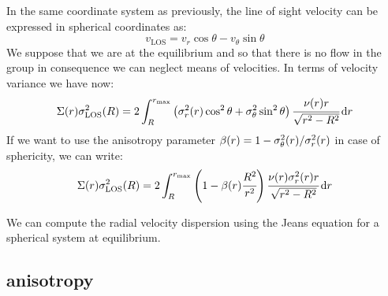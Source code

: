 In the same coordinate system as previously, the line of sight velocity can be
expressed in spherical coordinates as:
%
\begin{equation}
    v_{\mathrm{LOS}} = v_r \cos\theta - v_\theta \sin\theta
\end{equation}
%
We suppose that we are at the equilibrium and so that there is no flow in the
group in consequence we can neglect means of velocities. In terms of velocity
variance we have now:
%
\begin{equation}
    \Sigma(r)\sigma_{\mathrm{LOS}}^2(R) = 2\int_R^{r_{\max}}
    \left({\sigma_r^2(r)\cos^2\theta+\sigma_\theta^2\sin^2\theta}\right)
    \cfrac{\nu{(r)}{r}}{\sqrt{r^2-R^2}}\,{\rm{d}}{r}
\end{equation}
%
If we want to use the anisotropy parameter
$\beta(r)=1-\sigma_\theta^2(r)/\sigma_r^2(r)$ in case of sphericity, we can
write:
%
\begin{equation}
    \Sigma(r)\sigma_{\mathrm{LOS}}^2(R) = 2\int_R^{r_{\max}}
    \left({1-\beta(r)\cfrac{R^2}{r^2}}\right)
    \cfrac{\nu{(r)}{\sigma_r^2(r)}{r}}{\sqrt{r^2-R^2}}\,{\rm{d}}{r}
\end{equation}

We can compute the radial velocity dispersion using the Jeans equation for a
spherical system at equilibrium.

\subsection{\citet{ML+05} anisotropy}

